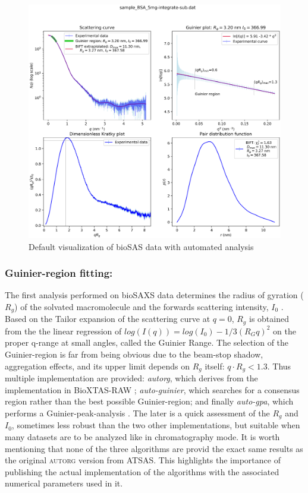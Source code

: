 \documentclass[preprint]{iucr}              %
\begin{document}
\begin{figure}
\label{plot}
\begin{center}
\includegraphics[width=12cm]{Figure_1.eps}
\caption{Default visualization of bioSAS data with automated analysis}
\end{center}
\end{figure}


\subsubsection{Guinier-region fitting:}
The first analysis performed on bioSAXS data determines the radius of gyration ($R_g$) of the solvated macromolecule and the forwards scattering intensity, $I_0$ \cite{guinier}.
Based on the Tailor expansion of the scattering curve at $q=0$, $R_g$ is obtained from the the linear regression of $log(I(q)) = log(I_0)-1/3 (R_{G}q)^{2}$ on the proper q-range at small angles, called the Guinier Range.
The selection of the Guinier-region is far from being obvious due to the beam-stop shadow, aggregation effects, and its upper limit depends on $R_g$ itself: $q \cdot R_g<1.3$.
Thus multiple implementation are provided: \textit{autorg}, which derives from the implementation in BioXTAS-RAW \cite{bioxtasraw}; \textit{auto-guinier}, which searches for a consensus region rather than the best possible Guinier-region; and finally \textit{auto-gpa}, which performs a Guinier-peak-analysis \cite{gpa}. 
The later is a quick assessment of the $R_g$ and $I_0$, sometimes less robust than the two other implementations, but suitable when many datasets are to be analyzed like in chromatography mode.
It is worth mentioning that none of the three algorithms are provid the exact same results as the original \textsc{autorg} \cite{ATSAS2} version from ATSAS. 
This highlights the importance of publishing the actual implementation of the algorithms with the associated numerical parameters used in it.
  
\end{document}
